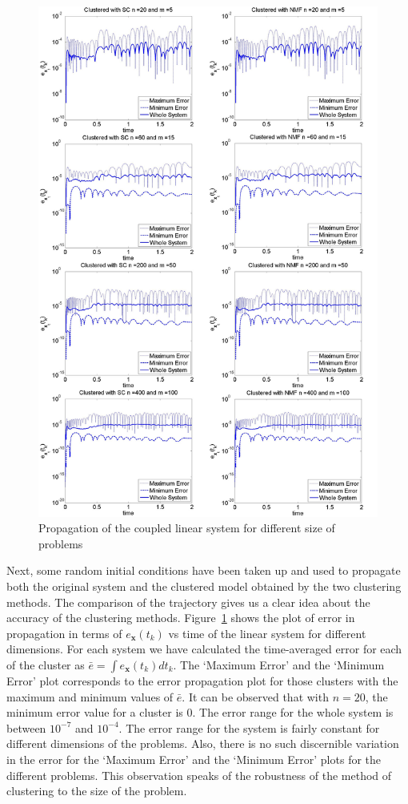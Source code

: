 \begin{figure}[H]
        \centering
        \includegraphics[width=\textwidth,height=\textwidth]{figures/FIG_12}
        \caption{Propagation of the coupled linear system for different size of problems}
        \label{linsyst_prop}
\end{figure}

Next, some random initial conditions have been taken up and used to propagate both the original system and the clustered model obtained by the two clustering methods. The comparison of the trajectory gives us a clear idea about the accuracy of the clustering methods. Figure~\ref{linsyst_prop} shows the plot of error in propagation in terms of $e_\textbf{x}(t_k)$ vs time of the linear system for different dimensions. For each system we have calculated the time-averaged error for each of the cluster as $\bar{e} = \int e_\textbf{x}(t_k) dt_k$. The `Maximum Error' and the `Minimum Error' plot corresponds to the error propagation plot for those clusters with the maximum and minimum values of $\bar{e}$. It can be observed that with $n = 20$, the minimum error value for a cluster is 0. The error range for the whole system is between $10^{-7}$ and $10^{-4}$. The error range for the system is fairly constant for different dimensions of the problems. Also, there is no such discernible variation in the error for the `Maximum Error' and the `Minimum Error' plots for the different problems. This observation speaks of the robustness of the method of clustering to the size of the problem. 

